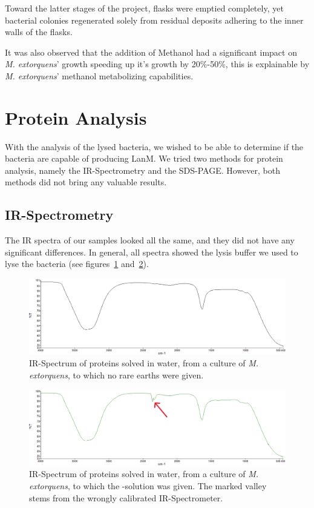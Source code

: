 Toward the latter stages of the project, flasks were emptied completely, yet bacterial colonies
regenerated solely from residual deposits adhering to the inner walls of the flasks.

It was also observed that the addition of Methanol had a significant impact on \emph{M. extorquens}’
growth speeding up it’s growth by 20\%-50\%, this is explainable by \emph{M. extorquens}’ methanol
metabolizing capabilities.

\newpage

\section{Protein Analysis\authorA}

With the analysis of the lysed bacteria, we wished to be able to determine if the bacteria are capable of producing LanM.
We tried two methods for protein analysis, namely the IR-Spectrometry and the SDS-PAGE.
However, both methods did not bring any valuable results.


\subsection{IR-Spectrometry}

The IR spectra of our samples looked all the same, and they did not have any significant differences.
In general, all spectra showed the lysis buffer we used to lyse the bacteria (see figures~\ref{fig:ir_spectrum_2} and~\ref{fig:ir_spectrum_1}).

\begin{figure}[H]
    \centering
    \includegraphics[width=1\textwidth]{./media/images/ir_spectrum_2}
    \caption{IR-Spectrum of proteins solved in water, from a culture of \emph{M. extorquens}, to which no rare earths were given. }
    \label{fig:ir_spectrum_2}
\end{figure}

\begin{figure}[H]
    \centering
    \includegraphics[width=1\textwidth]{./media/images/ir_spectrum_1}
    \caption{IR-Spectrum of proteins solved in water, from a culture of \emph{M. extorquens}, to which the -solution was given. The marked valley stems from the wrongly calibrated IR-Spectrometer. }
    \label{fig:ir_spectrum_1}
\end{figure}


